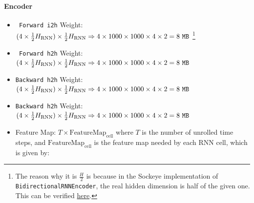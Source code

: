 \documentclass{article}
\begin{document}
\paragraph{Encoder}
\begin{itemize}
  \item \lstinline{ Forward i2h} Weight: \((4\times \frac{1}{2}H_\text{RNN})\times \frac{1}{2}H_\text{RNN}\Rightarrow 
  4\times 1000\times 1000\times 4\times 2=8\text{ }\mathtt{MB}\)
  \footnote{The reason why it is \(\frac{H}{2}\) is because in the Sockeye implementation of \lstinline{BidirectionalRNNEncoder},
  the real hidden dimension is half of the given one. 
  This can be verified \href{https://github.com/awslabs/sockeye/blob/3280f7b0111b705d2218096121a20f6471f1f4e8/sockeye/encoder.py\#L874}{here}.}
  \item \lstinline{ Forward h2h} Weight: \((4\times \frac{1}{2}H_\text{RNN})\times \frac{1}{2}H_\text{RNN}\Rightarrow 
  4\times 1000\times 1000\times 4\times 2=8\text{ }\mathtt{MB}\)
  \item \lstinline{Backward h2h} Weight: \((4\times \frac{1}{2}H_\text{RNN})\times \frac{1}{2}H_\text{RNN}\Rightarrow 
  4\times 1000\times 1000\times 4\times 2=8\text{ }\mathtt{MB}\)
  \item \lstinline{Backward h2h} Weight: \((4\times \frac{1}{2}H_\text{RNN})\times \frac{1}{2}H_\text{RNN}\Rightarrow 
  4\times 1000\times 1000\times 4\times 2=8\text{ }\mathtt{MB}\)
  \item Feature Map: \(T\times \text{FeatureMap}_\text{cell}\) 
  where \(T\) is the number of unrolled time steps,
  and \(\text{FeatureMap}_\text{cell}\) is the feature map needed by each RNN cell,
  which is given by:
\end{itemize}
\end{document}
